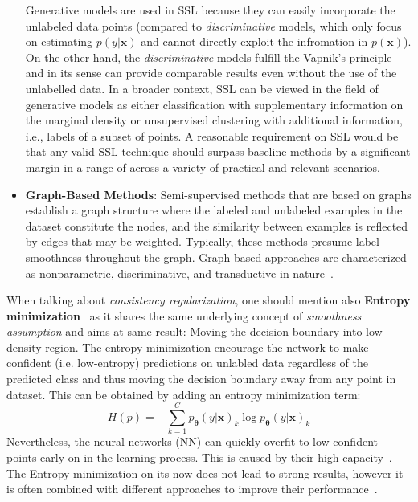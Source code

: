 \begin{itemize}
        Generative models are used in SSL because they can easily incorporate the unlabeled data points (compared to \textit{discriminative} models, which only focus on estimating
        $p(y|\mathbf{x})$ and cannot directly exploit the infromation in $p(\mathbf{x})$). On the other hand, the \textit{discriminative} models fulfill the Vapnik's principle and in its
        sense can provide comparable results even without the use of the unlabelled data.  In a broader context, SSL can be viewed in the field of generative models as 
        either classification with supplementary information on the marginal density or unsupervised clustering with additional information, i.e., labels of a subset 
        of points. A reasonable requirement on SSL would be that any valid SSL technique should surpass baseline methods by a significant margin in a range of across a
        variety of practical and relevant scenarios. 
    \item \textbf{Graph-Based Methods}:
    Semi-supervised methods that are based on graphs establish a graph structure where the labeled and unlabeled examples in the dataset constitute the nodes, and the 
    similarity between examples is reflected by edges that may be weighted. Typically, these methods presume label smoothness throughout the graph. Graph-based 
    approaches are characterized as nonparametric, discriminative, and transductive in nature~\cite{another-survey-2008}.
\end{itemize}

When talking about \textit{consistency regularization}, one should mention also \textbf{Entropy minimization}~\cite{entropy-min-2004} as it shares the same underlying concept
of \textit{smoothness assumption} and aims at same result: Moving the decision boundary into low-density region. The entropy minimization encourage the 
network to make confident (i.e. low-entropy) predictions on unlabled data regardless of the predicted class and thus moving the decision boundary away from any point in dataset.
This can be obtained by adding an entropy minimization term:
\begin{equation*}
    H(p) = -\sum_{k=1}^{C} p_\mathbf{\theta}(y|\mathbf{x})_k \log p_\mathbf{\theta}(y|\mathbf{x})_k
\end{equation*}
Nevertheless, the neural networks (NN) can quickly overfit to low confident points early on in the learning process. This is caused by their high capacity~\cite{how-to-evalute-ssl-2018}.
The Entropy minimization on its now does not lead to strong results, however it is often combined with different approaches to improve their performance~\cite{ssl-overview-2020}.

